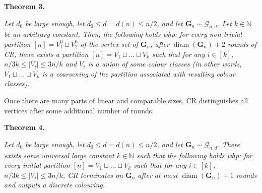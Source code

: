 \documentclass[10pt,a4paper]{article}
\begin{document}


\par\medskip\noindent\textbf{
\textbf{Theorem 3}\textbf{.}
}\par



\emph{Let $d_{0}$ be large enough, let $d_{0}\leq d=d(n)\leq n/2$, and let $\mathbf{G}_{n}\sim\mathcal{G}_{n,d}$. Let $k\in\mathbb{N}$ be an arbitrary constant. Then, the following holds whp: for every non-trivial partition $[n]=V_{1}^{0}\sqcup V_{2}^{0}$ of the vertex set of $\mathbf{G}_{n}$, after $\operatorname{diam}(\mathbf{G}_{n})+2$ rounds of CR, there exists a partition $[n]=V_{1}\sqcup\ldots\sqcup V_{k}$ such that for any $i\in[k]$, $n/3k\leq|V_{i}|\leq 3n/k$ and $V_{i}$ is a union of some colour classes (in other words, $V_{1}\sqcup\ldots\sqcup V_{k}$ is a coarsening of the partition associated with resulting colour classes).}\par






Once there are many parts of linear and comparable sizes, CR distinguishes all vertices after some additional number of rounds.\par





\par\medskip\noindent\textbf{
\textbf{Theorem 4}\textbf{.}
}\par



\emph{Let $d_{0}$ be large enough, let $d_{0}\leq d=d(n)\leq n/2$, and let $\mathbf{G}_{n}\sim\mathcal{G}_{n,d}$. There exists some universal large constant $k\in\mathbb{N}$ such that the following holds whp: for every initial partition $[n]=V_{1}\sqcup\ldots\sqcup V_{k}$ such that for any $i\in[k]$, $n/3k\leq|V_{i}|\leq 3n/k$, CR terminates on $\mathbf{G}_{n}$ after at most $\operatorname{diam}(\mathbf{G}_{n})+1$ rounds and outputs a discrete colouring.}\par



\end{document}
